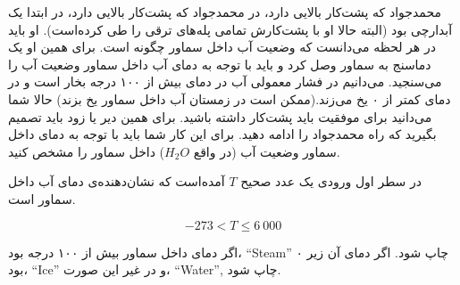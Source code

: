 \begin{problem}{}
{}{}
{}{}{}
    محمدجواد که پشت‌کار بالایی دارد، در محمدجواد که پشت‌کار بالایی دارد، در ابتدا یک آبدارچی بود (البته حالا او با پشت‌کارش تمامی پله‌های ترقی را طی کرده‌است). او باید در هر لحظه می‌دانست که وضعیت آب داخل سماور چگونه است. برای همین او یک دماسنج به سماور وصل کرد و باید با توجه به دمای آب داخل سماور وضعیت آب را می‌سنجید. می‌دانیم در فشار معمولی آب در دمای بیش از ۱۰۰ درجه بخار است و در دمای کمتر از ۰ یخ می‌زند.(ممکن است در زمستان آب داخل سماور یخ بزند)
    حالا شما می‌دانید برای موفقیت باید پشت‌کار داشته باشید. برای همین دیر یا زود باید تصمیم بگیرید که راه محمدجواد را ادامه دهید. برای این کار شما باید با توجه به دمای داخل سماور وضعیت آب (در واقع $H_2O$) داخل سماور را مشخص کنید.

    \InputFile
    در سطر اول ورودی یک عدد صحیح $T$ آمده‌است که نشان‌دهنده‌ی دمای آب داخل سماور است.

    $$ -273 < T \le 6\ 000$$



    \OutputFile

    اگر دمای داخل سماور بیش از ۱۰۰ درجه بود، ``Steam'' چاپ شود. اگر دمای آن زیر ۰ بود، ``Ice'' و در غیر این صورت، ``Water'', چاپ شود.
    \Examples

    \Example
    \begin{example}
    \end{example}

    \Example
    \begin{example}
    \end{example}

    \Example
    \begin{example}
    \end{example}


\end{problem}
